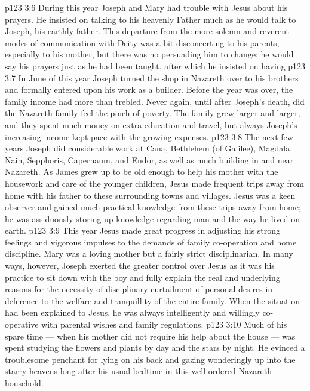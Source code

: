 \vs p123 3:6 \pc During this year Joseph and Mary had trouble with Jesus about his prayers. He insisted on talking to his heavenly Father much as he would talk to Joseph, his earthly father. This departure from the more solemn and reverent modes of communication with Deity was a bit disconcerting to his parents, especially to his mother, but there was no persuading him to change; he would say his prayers just as he had been taught, after which he insisted on having 
\vs p123 3:7 In June of this year Joseph turned the shop in Nazareth over to his brothers and formally entered upon his work as a builder. Before the year was over, the family income had more than trebled. Never again, until after Joseph’s death, did the Nazareth family feel the pinch of poverty. The family grew larger and larger, and they spent much money on extra education and travel, but always Joseph’s increasing income kept pace with the growing expenses.
\vs p123 3:8 The next few years Joseph did considerable work at Cana, Bethlehem (of Galilee), Magdala, Nain, Sepphoris, Capernaum, and Endor, as well as much building in and near Nazareth. As James grew up to be old enough to help his mother with the housework and care of the younger children, Jesus made frequent trips away from home with his father to these surrounding towns and villages. Jesus was a keen observer and gained much practical knowledge from these trips away from home; he was assiduously storing up knowledge regarding man and the way he lived on earth.
\vs p123 3:9 \pc This year Jesus made great progress in adjusting his strong feelings and vigorous impulses to the demands of family co\hyp{}operation and home discipline. Mary was a loving mother but a fairly strict disciplinarian. In many ways, however, Joseph exerted the greater control over Jesus as it was his practice to sit down with the boy and fully explain the real and underlying reasons for the necessity of disciplinary curtailment of personal desires in deference to the welfare and tranquillity of the entire family. When the situation had been explained to Jesus, he was always intelligently and willingly co\hyp{}operative with parental wishes and family regulations.
\vs p123 3:10 \pc Much of his spare time --- when his mother did not require his help about the house --- was spent studying the flowers and plants by day and the stars by night. He evinced a troublesome penchant for lying on his back and gazing wonderingly up into the starry heavens long after his usual bedtime in this well\hyp{}ordered Nazareth household.
